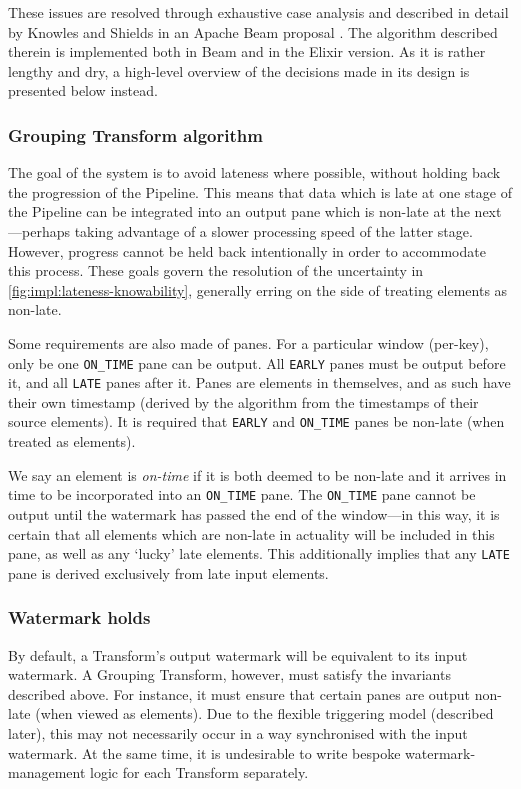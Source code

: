 These issues are resolved through exhaustive case analysis and described in detail by Knowles and Shields in an Apache Beam proposal \cite{BEAM-doc-lateness}.
The algorithm described therein is implemented both in Beam and in the Elixir version.
As it is rather lengthy and dry, a high-level overview of the decisions made in its design is presented below instead.

\subsubsection{Grouping Transform algorithm}

The goal of the system is to avoid lateness where possible, without holding back the progression of the Pipeline.
This means that data which is late at one stage of the Pipeline can be integrated into an output pane which is non-late at the next---perhaps taking advantage of a slower processing speed of the latter stage.
However, progress cannot be held back intentionally in order to accommodate this process.
These goals govern the resolution of the uncertainty in \cref{fig:impl:lateness-knowability}, generally erring on the side of treating elements as non-late.

Some requirements are also made of panes.
For a particular window (per-key), only be one \verb|ON_TIME| pane can be output.
All \verb|EARLY| panes must be output before it, and all \verb|LATE| panes after it.
Panes are elements in themselves, and as such have their own timestamp (derived by the algorithm from the timestamps of their source elements).
It is required that \verb|EARLY| and \verb|ON_TIME| panes be non-late (when treated as elements).

We say an element is \emph{on-time} if it is both deemed to be non-late and it arrives in time to be incorporated into an \verb|ON_TIME| pane.
The \verb|ON_TIME| pane cannot be output until the watermark has passed the end of the window---in this way, it is certain that all elements which are non-late in actuality will be included in this pane, as well as any `lucky' late elements.
This additionally implies that any \verb|LATE| pane is derived exclusively from late input elements.

\subsubsection{Watermark holds}

By default, a Transform's output watermark will be equivalent to its input watermark.
A Grouping Transform, however, must satisfy the invariants described above.
For instance, it must ensure that certain panes are output non-late (when viewed as elements).
Due to the flexible triggering model (described later), this may not necessarily occur in a way synchronised with the input watermark.
At the same time, it is undesirable to write bespoke watermark-management logic for each Transform separately.

